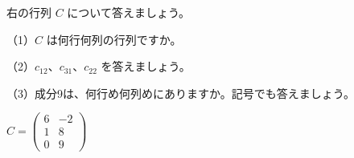 \begin{jibun}
\noindent\begin{minipage}[c]{0.7\linewidth}\raggedright
右の行列 $C$ について答えましょう。\par
（1）$C$ は何行何列の行列ですか。\par
（2）$c_{12}$、$c_{31}$、$c_{22}$ を答えましょう。\par
（3）成分9は、何行め何列めにありますか。記号でも答えましょう。
\end{minipage}\hfill
\begin{minipage}[c]{0.27\linewidth}\centering
$C=\begin{pmatrix} 6 & -2\\ 1 & 8\\ 0 & 9 \end{pmatrix}$
\end{minipage}
\end{jibun}

